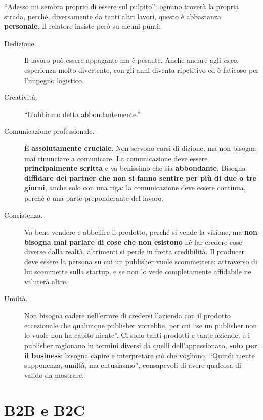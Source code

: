 ``Adesso mi sembra proprio di essere sul pulpito'': ognuno troverà la propria
strada, perché, diversamente da tanti altri lavori, questo è abbastanza
\textbf{personale}. Il relatore insiste però su alcuni punti:
\begin{description}
  \item[Dedizione.] Il lavoro può essere appagante ma è pesante. Anche andare
        agli \emph{expo}, esperienza molto divertente, con gli anni diventa
        ripetitivo ed è faticoso per l'impegno logistico.
  \item[Creatività.] ``L'abbiamo detta abbondantemente.''
  \item[Comunicazione professionale.] È \textbf{assolutamente cruciale}. Non
        servono corsi di dizione, ma non bisogna mai rinunciare a comunicare. La
        comunicazione deve essere \textbf{principalmente scritta} e va benissimo
        che sia \textbf{abbondante}. Bisogna \textbf{diffidare dei partner che
        non si fanno sentire per più di due o tre giorni}, anche solo con una
        riga: la comunicazione deve essere continua, perché è una parte
        preponderante del lavoro.
  \item[Consistenza.] Va bene vendere e abbellire il prodotto, perché si vende la
        visione, ma \textbf{non bisogna mai parlare di cose che non esistono} né
        far credere cose diverse dalla realtà, altrimenti si perde in fretta
        credibilità. Il producer deve essere la persona su cui un publisher vuole
        scommettere: attraverso di lui scommette sulla startup, e se non lo vede
        completamente affidabile ne valuterà altre.
  \item[Umiltà.] Non bisogna cadere nell'errore di credersi l'azienda con il
        prodotto eccezionale che qualunque publisher vorrebbe, per cui ``se un
        publisher non lo vuole non ha capito niente''. Ci sono tanti prodotti e
        tante aziende, e i publisher ragionano in termini diversi da quelli
        dell'appassionato, \textbf{solo per il business}: bisogna capire e
        interpretare ciò che vogliono. ``Quindi niente supponenza, umiltà, ma
        entusiasmo'', consapevoli di avere qualcosa di valido da mostrare.
\end{description}

\section{B2B e B2C}
\label{sec:z5-b2b}

